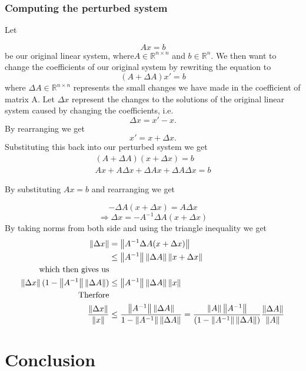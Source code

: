 \documentclass[12pt,reqno,twoside,titlepage]{article}
\begin{document}
\subsubsection{Computing the perturbed system}
Let

$$Ax=b$$
be our original linear system, where$A\in\mathbb{R}^{n\times n}$ and $b\in\mathbb{R}^n$.
\newline
We then want to change the coefficients of our original system by rewriting the equation to
$$(A+\Delta A)x'=b$$
where $\Delta A\in \mathbb{R}^{n\times n}$ represents the small changes we have made in the coefficient of matrix A.
\newline
Let $\Delta x$ represent the changes to the solutions of the original linear system caused by changing the coefficients, i.e. 
$$\Delta x=x'-x.$$
\newline 
By rearranging we get
$$x'=x+\Delta x.$$
Substituting this back into our perturbed system we get
\begin{align*}
(A+\Delta A)(x+\Delta x)= b\\
Ax+A\Delta x+\Delta A x+\Delta A\Delta x=b
\end{align*}

By substituting $Ax=b$ and rearranging  we get

$$-\Delta A(x+\Delta x)=A\Delta x$$
$$\Rightarrow \Delta x=-A^{-1}\Delta A(x+\Delta x)$$
By taking norms from both side and using the triangle inequality we get
\begin{align*}
\left\lVert\Delta x\right\rVert&=\left\lVert A^{-1}\Delta A(x+\Delta x)\right\rVert
\\ &\leq \left\lVert A^{-1}\right\rVert\left\lVert\Delta A\right\rVert \left\lVert x+ \Delta x\right\rVert\\
\text{which then gives us}\\
\left\lVert\Delta x\right\rVert(1-\left\lVert A^{-1}\right\rVert\left\lVert\Delta A\right\rVert)&\leq\left\lVert A^{-1}\right\rVert\left\lVert\Delta A\right\rVert\left\lVert x\right\rVert
\\\text{Therfore}\\
\frac{\left\lVert\Delta x\right\rVert}{\left\lVert x\right\rVert} &\leq\frac{\left\lVert A^{-1}\right\rVert\left\lVert\Delta A\right\rVert}{1-\left\lVert A^{-1}\right\rVert\left\lVert\Delta A\right\rVert}
=\frac{\left\lVert A\right\rVert\left\lVert A^{-1}\right\rVert}{(1-\left\lVert A^{-1}\right\rVert\left\lVert\Delta A\right\rVert)}\frac{\left\lVert\Delta A\right\rVert}{\left\lVert A\right\rVert}
\end{align*}
\cite{golub2012matrix}
\section{Conclusion}


\end{document}
